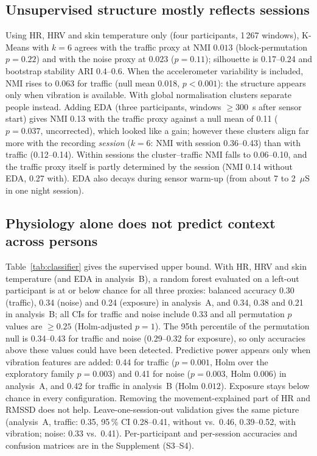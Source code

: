 \documentclass[runningheads]{llncs}
\begin{document}
\subsection{Unsupervised structure mostly reflects sessions}
Using HR, HRV and skin temperature only (four participants, 1\,267 windows), K-Means with $k=6$ agrees with the traffic proxy at NMI $0.013$ (block-permutation $p=0.22$) and with the noise proxy at $0.023$ ($p=0.11$); silhouette is 0.17--0.24 and bootstrap stability ARI 0.4--0.6. When the accelerometer variability is included, NMI rises to 0.063 for traffic (null mean 0.018, $p<0.001$): the structure appears only when vibration is available. With global normalisation clusters separate people instead. Adding EDA (three participants, windows $\geq$300~s after sensor start) gives NMI 0.13 with the traffic proxy against a null mean of 0.11 ($p=0.037$, uncorrected), which looked like a gain; however these clusters align far more with the recording \emph{session} ($k=6$: NMI with session 0.36--0.43) than with traffic (0.12--0.14). Within sessions the cluster--traffic NMI falls to 0.06--0.10, and the traffic proxy itself is partly determined by the session (NMI 0.14 without EDA, 0.27 with). EDA also decays during sensor warm-up (from about 7 to 2~$\mu$S in one night session).

\subsection{Physiology alone does not predict context across persons}
Table~\ref{tab:classifier} gives the supervised upper bound. With HR, HRV and skin temperature (and EDA in analysis~B), a random forest evaluated on a left-out participant is at or below chance for all three proxies: balanced accuracy 0.30 (traffic), 0.34 (noise) and 0.24 (exposure) in analysis~A, and 0.34, 0.38 and 0.21 in analysis~B; all CIs for traffic and noise include 0.33 and all permutation $p$ values are $\geq0.25$ (Holm-adjusted $p=1$). The 95th percentile of the permutation null is 0.34--0.43 for traffic and noise (0.29--0.32 for exposure), so only accuracies above these values could have been detected. Predictive power appears only when vibration features are added: 0.44 for traffic ($p=0.001$, Holm over the exploratory family $p=0.003$) and 0.41 for noise ($p=0.003$, Holm $0.006$) in analysis~A, and 0.42 for traffic in analysis~B (Holm $0.012$). Exposure stays below chance in every configuration. Removing the movement-explained part of HR and RMSSD does not help. Leave-one-session-out validation gives the same picture (analysis~A, traffic: 0.35, 95\,\% CI 0.28--0.41, without vs.\ 0.46, 0.39--0.52, with vibration; noise: 0.33 vs.\ 0.41). Per-participant and per-session accuracies and confusion matrices are in the Supplement (S3--S4).
\end{document}
